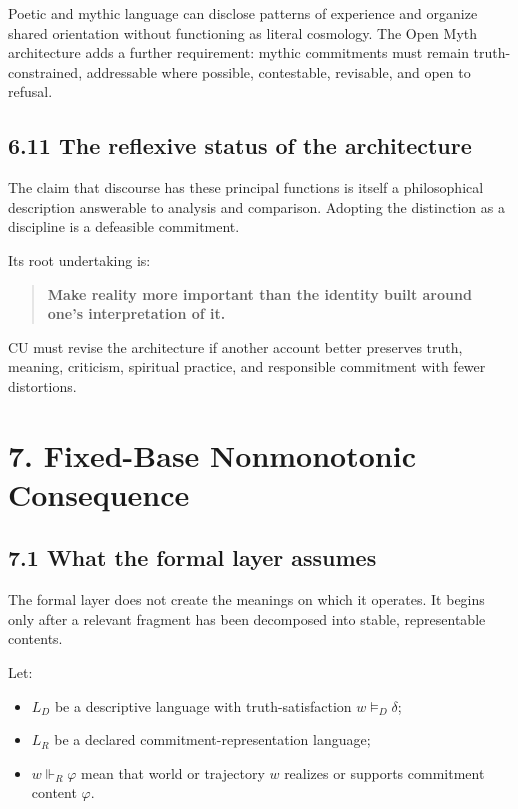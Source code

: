 \documentclass[
  11pt,
]{article}
\providecommand{\tightlist}{%
  \setlength{\itemsep}{0pt}\setlength{\parskip}{0pt}}
\begin{document}
Poetic and mythic language can disclose patterns of experience and
organize shared orientation without functioning as literal cosmology.
The Open Myth architecture adds a further requirement: mythic
commitments must remain truth-constrained, addressable where possible,
contestable, revisable, and open to refusal.

\subsection{6.11 The reflexive status of the
architecture}\label{the-reflexive-status-of-the-architecture}

The claim that discourse has these principal functions is itself a
philosophical description answerable to analysis and comparison.
Adopting the distinction as a discipline is a defeasible commitment.

Its root undertaking is:

\begin{quote}
\textbf{Make reality more important than the identity built around one's
interpretation of it.}
\end{quote}

CU must revise the architecture if another account better preserves
truth, meaning, criticism, spiritual practice, and responsible
commitment with fewer distortions.

\section{7. Fixed-Base Nonmonotonic
Consequence}\label{fixed-base-nonmonotonic-consequence}

\subsection{7.1 What the formal layer
assumes}\label{what-the-formal-layer-assumes}

The formal layer does not create the meanings on which it operates. It
begins only after a relevant fragment has been decomposed into stable,
representable contents.

Let:

\begin{itemize}
\tightlist
\item
  \(L_D\) be a descriptive language with truth-satisfaction
  \(w\vDash_D\delta\);
\item
  \(L_R\) be a declared commitment-representation language;
\item
  \(w\Vdash_R\varphi\) mean that world or trajectory \(w\) realizes or
  supports commitment content \(\varphi\).
\end{itemize}
\end{document}
